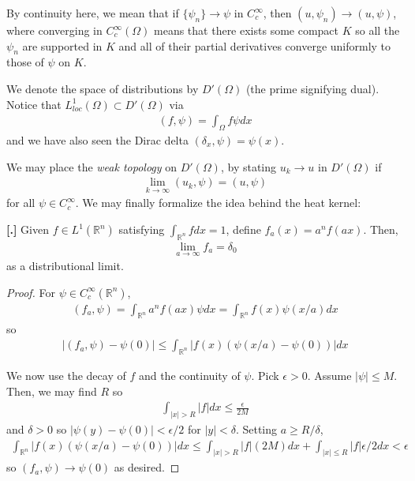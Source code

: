 \documentclass{article}
\newcommand{\R}{{\mathbb{R}}}
\newcounter{result}[section]
\newenvironment{res}[1][]{\refstepcounter{result}\par\medskip
	\noindent \textbf{[\thesection.\theresult] #1} \rmfamily}{\medskip}
\begin{document}
	By continuity here, we mean that if $\{\psi_{n}\} \to \psi$ in $C_{c}^{\infty}$, then $ (u,\psi_{n}) \to (u,\psi)$, where converging in $C_{c}^{\infty}(\Omega)$ means that there exists some compact $K$ so all the $\psi_{n}$ are supported in $K$ and all of their partial derivatives converge uniformly to those of $\psi$ on $K$. 
	
	We denote the space of distributions by $D'(\Omega)$ (the prime signifying dual). Notice that $L_{loc}^{1}(\Omega) \subset D'(\Omega)$ via 
	\begin{align*}
		(f,\psi) = \int_{\Omega} f \psi dx
	\end{align*}
	and we have also seen the Dirac delta $(\delta_{x},\psi) = \psi(x)$. 
	
	We may place the \textit{weak topology} on $D'(\Omega)$, by stating $u_{k} \to u$ in $D'(\Omega)$ if 
	\begin{align*}
		\lim_{k \to \infty} (u_k,\psi) = (u,\psi)
	\end{align*}
	for all $\psi \in C_{c}^{\infty}$. We may finally formalize the idea behind the heat kernel:
	
	
	\begin{res}
		Given $f \in L^{1}(\R^{n})$ satisfying $\int_{\R^{n}} f dx = 1$, define $f_{a}(x) = a^{n}f(ax)$. Then,
		\begin{align*}
			\lim_{a \to \infty} f_{a} = \delta_0
		\end{align*}
		as a distributional limit.
	\end{res}
	\begin{proof}
		For $\psi \in C_{c}^{\infty}(\R^{n})$, 
		\begin{align*}
			(f_a,\psi) = \int_{\R^{n}} a^{n}f(ax)\psi dx = \int_{\R^{n}} f(x) \psi(x/a)dx
		\end{align*}
		so 
		\begin{align*}
			|(f_{a},\psi) - \psi(0)| \leq \int_{\R^{n}} |f(x) (\psi(x/a)-\psi(0))|dx
		\end{align*}
		
		We now use the decay of $f$ and the continuity of $\psi$. Pick $\epsilon > 0$. Assume $|\psi| \leq M$. Then, we may find $R$ so 
		\begin{align*}
			\int_{|x| > R} |f| dx \leq \frac{\epsilon}{2M}
		\end{align*}
		and $\delta > 0 $ so $|\psi(y) - \psi(0)| < \epsilon/2$ for $|y| < \delta$. Setting $a \geq R/\delta$, 
		\begin{align*}
			\int_{\R^{n}} |f(x) (\psi(x/a)-\psi(0))|dx \leq \int_{|x| >R} |f| (2M) dx + \int_{|x|\leq R} | f| \epsilon /2dx < \epsilon
		\end{align*}
		so $(f_a,\psi) \to \psi(0)$ as desired. 
	\end{proof}
	
\end{document}
